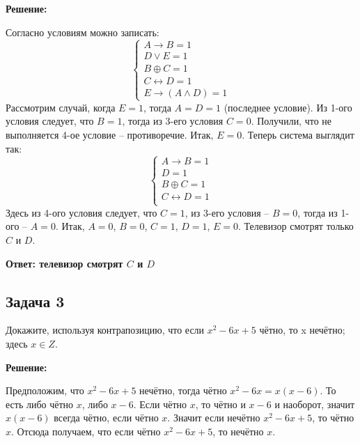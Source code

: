 \documentclass[a4paper,14pt]{article} %
\begin{document}
\begin{center}
\bfseries
\newpage
{\Large Решение: }
\end{center}


Согласно условиям можно записать:
 \[\begin{cases}
   A \rightarrow B = 1\\
   D \vee E = 1\\
   B \oplus C = 1\\
   C \leftrightarrow D = 1\\
   E \rightarrow (A \wedge D) = 1
\end{cases}\]
Рассмотрим случай, когда $E = 1$, тогда $A = D = 1$ (последнее условие). Из 1-ого условия следует, что $B = 1$, тогда из 3-его условия $C = 0$. Получили, что не выполняется 4-ое условие -- противоречие. Итак, $E = 0$.
Теперь система выглядит так:
  \[\begin{cases}
   A \rightarrow B = 1\\
   D = 1\\
   B \oplus C = 1\\
   C \leftrightarrow D = 1\\
\end{cases}\]
Здесь из 4-ого условия следует, что $C = 1$, из 3-его условия -- $B = 0$, тогда из 1-ого -- $A = 0$.
Итак, $A = 0$, $B = 0$, $C = 1$, $D = 1$, $E = 0$. Телевизор смотрят только $C$ и $D$.
\begin{flushright}
\begin{large}
\textbf {Ответ: телевизор смотрят $C$ и $D$}
\end{large}
\end{flushright}

\newpage
\begin{center}
\subsection{Задача 3}
\end{center}

 Докажите, используя контрапозицию, что если $x^2 - 6x + 5$ чётно, то x нечётно; здесь $x \in Z$.
\begin{center}
\bfseries
{\Large Решение: }
\end{center}


Предположим, что $x^2 - 6x + 5$ нечётно, тогда чётно $x^2 - 6x = x(x-6)$. То есть либо чётно $x$, либо $x-6$. Если чётно $x$, то чётно и $x-6$ и наоборот, значит $x(x-6)$ всегда чётно, если чётно $x$. Значит если нечётно  $x^2 - 6x + 5$, то чётно $x$. Отсюда получаем, что если чётно $x^2 - 6x + 5$, то нечётно $x$.
\end{document}
